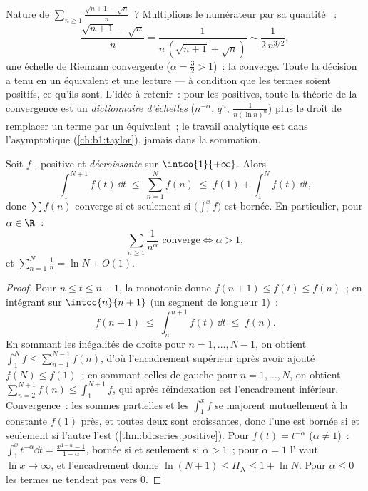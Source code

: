 \begin{example}\label{ex:b1:series:equivtest}
Nature de $\sum_{n \geq 1} \frac{\sqrt{n+1} - \sqrt n}{n}$~?
Multiplions le numérateur par sa quantité ~:
\[
\frac{\sqrt{n+1} - \sqrt n}{n}
= \frac{1}{n\,(\sqrt{n+1} + \sqrt n)}
\sim \frac{1}{2\,n^{3/2}} ,
\]
une échelle de Riemann convergente ($\alpha = \frac32 > 1$)~: la
 converge. Toute la décision a tenu en un équivalent et une
lecture --- à condition que les termes soient positifs, ce qu'ils
sont. L'idée à retenir~: pour les  positives, toute la théorie
de la convergence est un \emph{dictionnaire d'échelles}
($n^{-\alpha}$, $q^n$, $\frac{1}{n(\ln n)^\alpha}$) plus le droit de
remplacer un terme par un équivalent~; le travail analytique est
dans l'asymptotique (\cref{ch:b1:taylor}), jamais dans la sommation.
\end{example}

\begin{theorem}\label{thm:b1:series:riemann}
Soit $f$ , positive et \emph{décroissante} sur
$\intco{1}{+\infty}$. Alors
\[
\int_1^{N+1} f(t)\,\dd t \;\leq\; \sum_{n=1}^{N} f(n) \;\leq\; f(1)
+ \int_1^{N} f(t)\,\dd t ,
\]
donc $\sum f(n)$ converge si et seulement si $\bigl(\int_1^x f\bigr)$
est bornée. En particulier, pour $\alpha \in \R$~:
\[
\sum_{n \geq 1} \frac{1}{n^\alpha} \text{ converge}
\iff \alpha > 1,
\]
et $\sum_{n=1}^{N} \frac1n = \ln N + O(1)$.
\end{theorem}

\begin{proof}
Pour $n \leq t \leq n+1$, la monotonie donne $f(n+1) \leq f(t)
\leq f(n)$~; en intégrant sur $\intcc{n}{n+1}$ (un segment de
longueur $1$)~:
\[
f(n+1) \;\leq\; \int_n^{n+1} f(t)\,\dd t \;\leq\; f(n) .
\]
En sommant les inégalités de droite pour $n = 1, \dots, N-1$, on
obtient $\int_1^{N} f \leq \sum_{n=1}^{N-1} f(n)$, d'où
l'encadrement supérieur après avoir ajouté $f(N) \leq f(1)$~; en
sommant celles de gauche pour $n = 1, \dots, N$, on obtient
$\sum_{n=2}^{N+1} f(n) \leq \int_1^{N+1} f$, qui après réindexation
est l'encadrement inférieur. Convergence~: les sommes partielles et
les  $\int_1^x f$ se majorent mutuellement à la constante
$f(1)$ près, et toutes deux sont croissantes, donc l'une est bornée
si et seulement si l'autre l'est (\cref{thm:b1:series:positive}).
Pour $f(t) = t^{-\alpha}$ ($\alpha \neq 1$)~: $\int_1^x
t^{-\alpha}\dd t = \frac{x^{1-\alpha} - 1}{1 - \alpha}$, bornée si et
seulement si $\alpha > 1$~; pour $\alpha = 1$ l' vaut
$\ln x \to \infty$, et l'encadrement donne $\ln(N+1) \leq H_N \leq 1
+ \ln N$. Pour $\alpha \leq 0$ les termes ne tendent pas vers $0$.
\end{proof}

